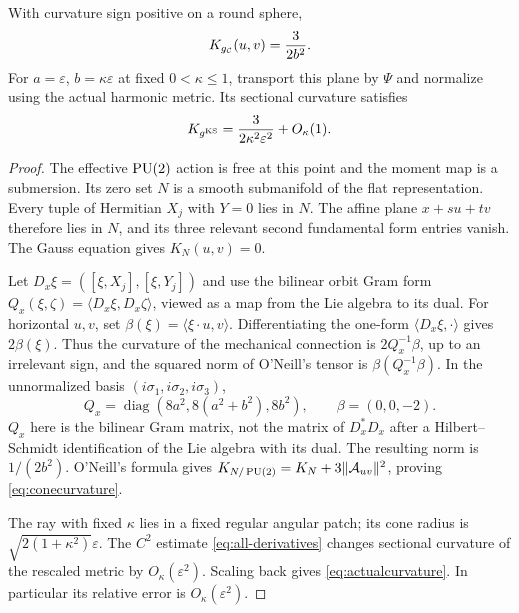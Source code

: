 \begin{proposition}\label{prop:curvature}
With curvature sign positive on a round sphere,
\begin{equation}\label{eq:conecurvature}
 K_{g_{\mathcal C}}(u,v)=\frac3{2b^2}.
\end{equation}
For $a=\varepsilon$, $b=\kappa\varepsilon$ at fixed
$0<\kappa\le1$, transport this plane by $\Psi$ and normalize
using the actual harmonic metric. Its sectional curvature satisfies
\begin{equation}\label{eq:actualcurvature}
 K_{g^{\mathrm{KS}}}=\frac3{2\kappa^2\varepsilon^2}+O_\kappa(1).
\end{equation}
\end{proposition}
\begin{proof}
The effective $\operatorname{PU}(2)$ action is free at this point and the moment
map is a submersion. Its zero set $N$ is a smooth submanifold of
the flat representation. Every tuple of Hermitian $X_j$ with
$Y=0$ lies in $N$. The affine plane $x+su+tv$ therefore lies
in $N$, and its three relevant second fundamental form entries
vanish. The Gauss equation gives $K_N(u,v)=0$.

Let $D_x\xi=([\xi,X_j],[\xi,Y_j])$ and use the bilinear
orbit Gram form $Q_x(\xi,\zeta)=\langle D_x\xi,D_x\zeta\rangle$,
viewed as a map from the Lie algebra to its dual. For horizontal
$u,v$, set $\beta(\xi)=\langle\xi\cdot u,v\rangle$.
Differentiating the one-form $\langle D_x\xi,\cdot\rangle$
gives $2\beta(\xi)$. Thus the curvature of the mechanical
connection is $2Q_x^{-1}\beta$, up to an irrelevant sign, and
the squared norm of O'Neill's tensor is $\beta(Q_x^{-1}\beta)$.
In the unnormalized basis $(i\sigma_1,i\sigma_2,i\sigma_3)$,
\begin{equation}\label{eq:orbitgram}
 Q_x=\operatorname{diag}(8a^2,8(a^2+b^2),8b^2),\qquad
 \beta=(0,0,-2).
\end{equation}
$Q_x$ here is the bilinear Gram matrix, not the matrix of
$D_x^*D_x$ after a Hilbert--Schmidt identification of the Lie
algebra with its dual. The resulting norm is $1/(2b^2)$.
O'Neill's formula \cite{oneill,bielawski} gives
$K_{N/\operatorname{PU}(2)}=K_N+3\|\mathcal A_{uv}\|^2$, proving
\eqref{eq:conecurvature}.

The ray with fixed $\kappa$ lies in a fixed regular angular patch;
its cone radius is $\sqrt{2(1+\kappa^2)}\varepsilon$.
The $C^2$ estimate \eqref{eq:all-derivatives} changes sectional
curvature of the rescaled metric by $O_\kappa(\varepsilon^2)$.
Scaling back gives \eqref{eq:actualcurvature}. In particular its
relative error is $O_\kappa(\varepsilon^2)$.
\end{proof}

